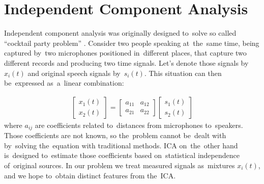 
\section{Independent Component Analysis}\label{app_ica}

Independent component analysis was originally designed to~solve so called “cocktail party problem” \cite{hyvarinen1997fast,hyvarinen2000independent,li2002machine,he2007detection,zuo2005feature}. Consider two people speaking at~the~same time, being captured by~two microphones positioned in~different places, that capture two different records and producing two time signals. Let’s denote those signals by~$x_i(t)$ and original speech signals by~$s_i(t)$. This situation can then be~expressed as~a~linear combination:

\begin{gather}
 \begin{bmatrix} x_1(t) \\ x_2(t) \end{bmatrix}
 =
 \begin{bmatrix}
  a_{11} & a_{12} \\
  a_{21} & a_{22}
  \end{bmatrix}
  \begin{bmatrix} s_1(t) \\ s_2(t) \end{bmatrix}
\end{gather}
where $a_{ij}$ are coefficients related to~distances from microphones to~speakers. Those coefficients are not known, so the~problem cannot be~dealt with by~solving the~equation with traditional methods. ICA on~the~other hand is~designed to~estimate those coefficients based on~statistical independence of~original sources. In our problem we treat measured signals as~mixtures $x_i(t)$, and we hope to~obtain distinct features from the~ICA.

